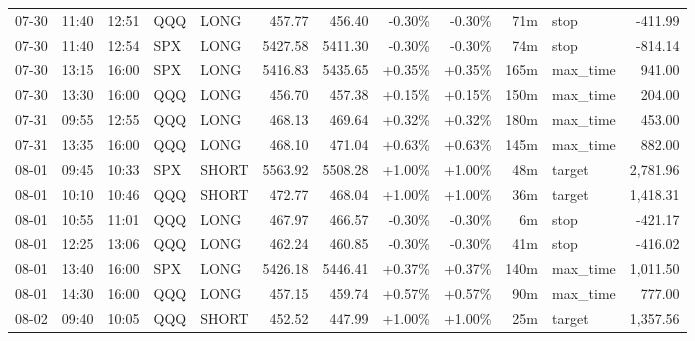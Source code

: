 \documentclass[11pt,a4paper,twoside]{article}
\begin{document}
\begin{center}
\begin{longtable}{>{\color{txtmain}}l l l l l r r r r r >{\color{txtmain}}l r}
07-30 & 11:40 & 12:51 & QQQ & LONG & 457.77 & 456.40 & \textcolor{lossred}{-0.30\%} & \textcolor{lossred}{-0.30\%} & 71m & stop & \textcolor{lossred}{-411.99} \\
07-30 & 11:40 & 12:54 & SPX & LONG & 5427.58 & 5411.30 & \textcolor{lossred}{-0.30\%} & \textcolor{lossred}{-0.30\%} & 74m & stop & \textcolor{lossred}{-814.14} \\
07-30 & 13:15 & 16:00 & SPX & LONG & 5416.83 & 5435.65 & \textcolor{wingreen}{+0.35\%} & \textcolor{wingreen}{+0.35\%} & 165m & max\_time & \textcolor{wingreen}{941.00} \\
07-30 & 13:30 & 16:00 & QQQ & LONG & 456.70 & 457.38 & \textcolor{wingreen}{+0.15\%} & \textcolor{wingreen}{+0.15\%} & 150m & max\_time & \textcolor{wingreen}{204.00} \\
07-31 & 09:55 & 12:55 & QQQ & LONG & 468.13 & 469.64 & \textcolor{wingreen}{+0.32\%} & \textcolor{wingreen}{+0.32\%} & 180m & max\_time & \textcolor{wingreen}{453.00} \\
07-31 & 13:35 & 16:00 & QQQ & LONG & 468.10 & 471.04 & \textcolor{wingreen}{+0.63\%} & \textcolor{wingreen}{+0.63\%} & 145m & max\_time & \textcolor{wingreen}{882.00} \\
08-01 & 09:45 & 10:33 & SPX & SHORT & 5563.92 & 5508.28 & \textcolor{wingreen}{+1.00\%} & \textcolor{wingreen}{+1.00\%} & 48m & target & \textcolor{wingreen}{2,781.96} \\
08-01 & 10:10 & 10:46 & QQQ & SHORT & 472.77 & 468.04 & \textcolor{wingreen}{+1.00\%} & \textcolor{wingreen}{+1.00\%} & 36m & target & \textcolor{wingreen}{1,418.31} \\
08-01 & 10:55 & 11:01 & QQQ & LONG & 467.97 & 466.57 & \textcolor{lossred}{-0.30\%} & \textcolor{lossred}{-0.30\%} & 6m & stop & \textcolor{lossred}{-421.17} \\
08-01 & 12:25 & 13:06 & QQQ & LONG & 462.24 & 460.85 & \textcolor{lossred}{-0.30\%} & \textcolor{lossred}{-0.30\%} & 41m & stop & \textcolor{lossred}{-416.02} \\
08-01 & 13:40 & 16:00 & SPX & LONG & 5426.18 & 5446.41 & \textcolor{wingreen}{+0.37\%} & \textcolor{wingreen}{+0.37\%} & 140m & max\_time & \textcolor{wingreen}{1,011.50} \\
08-01 & 14:30 & 16:00 & QQQ & LONG & 457.15 & 459.74 & \textcolor{wingreen}{+0.57\%} & \textcolor{wingreen}{+0.57\%} & 90m & max\_time & \textcolor{wingreen}{777.00} \\
08-02 & 09:40 & 10:05 & QQQ & SHORT & 452.52 & 447.99 & \textcolor{wingreen}{+1.00\%} & \textcolor{wingreen}{+1.00\%} & 25m & target & \textcolor{wingreen}{1,357.56} \\

\end{longtable}
\end{center}
\end{document}
